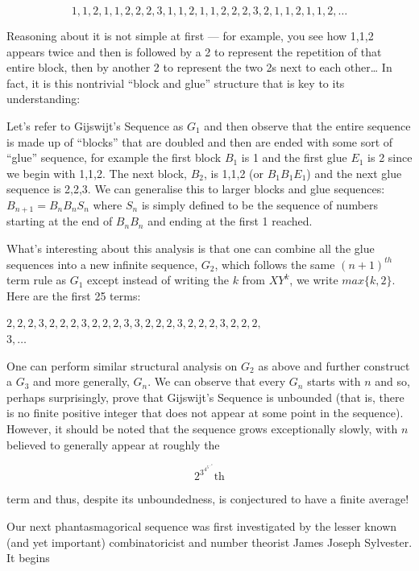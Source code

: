 \[1, 1, 2, 1, 1, 2, 2, 2, 3, 1, 1, 2, 1, 1, 2, 2, 2, 3, 2, 1, 1, 2, 1, 1, 2, \ldots\]

Reasoning about it is not simple at first --- for example, you see how 1,1,2 appears twice and then is followed by a 2 to represent the repetition of that entire block, then by another 2 to represent the two 2s next to each other… In fact, it is this nontrivial “block and glue” structure that is key to its understanding:\par
Let’s refer to Gijswijt’s Sequence as \(G_1\) and then observe that the entire sequence is made up of “blocks” that are doubled and then are ended with some sort of “glue” sequence, for example the first block \(B_1\) is 1 and the first glue \(E_1\) is 2 since we begin with 1,1,2. The next block, \(B_2\), is 1,1,2 (or \(B_1B_1E_1\)) and the next glue sequence is 2,2,3. We can generalise this to larger blocks and glue sequences: \(B_{n+1} = B_nB_nS_n\) where \(S_n\) is simply defined to be the sequence of numbers starting at the end of \(B_nB_n\) and ending at the first 1 reached.\par
What’s interesting about this analysis is that one can combine all the glue sequences into a new infinite sequence, \(G_2\), which follows the same \((n+1)^{th}\) term rule as \(G_1\) except instead of writing the \(k\) from \(XY^k\), we write \(max\{k, 2\}\). Here are the first 25 terms:\par

\(2, 2, 2, 3, 2, 2, 2, 3, 2, 2, 2, 3, 3, 2, 2, 2, 3, 2, 2, 2, 3, 2, 2, 2,\)\\\( 3, \ldots\)

One can perform similar structural analysis on \(G_2\) as above and further construct a \(G_3\) and more generally, \(G_n\). We can observe that every \(G_n\) starts with \(n\) and so, perhaps surprisingly, prove that Gijswijt’s Sequence is unbounded (that is, there is no finite positive integer that does not appear at some point in the sequence). However, it should be noted that the sequence grows exceptionally slowly, with \(n\) believed to generally appear at roughly the\par

\[2^{3^{4^{5^{\ldots^{n}}}}}\textrm{th}\]

term and thus, despite its unboundedness, is conjectured to have a finite average!\par

\triast

Our next phantasmagorical sequence was first investigated by the lesser known (and yet important) combinatoricist and number theorist James Joseph Sylvester. It begins\par

